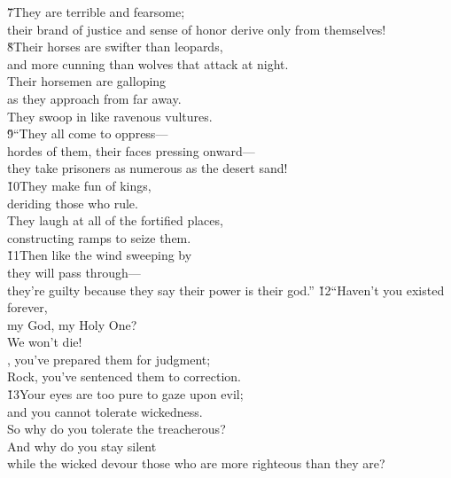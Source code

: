 \begin{poetry}
\poeml \v{7}They are terrible and fearsome; \\
\poemll    their brand of justice and sense of honor derive only from themselves! \\
\poeml \v{8}Their horses are swifter than leopards, \\
\poemll    and more cunning than wolves that attack at night. \\
\poeml Their horsemen are galloping \\
\poemll    as they approach from far away. \\
\poeml They swoop in like ravenous vultures. \\
\poeml \v{9}``They all come to oppress--- \\
\poemll    hordes of them, their faces pressing onward--- \\
\poeml they take prisoners as numerous as the desert sand! \\
\poeml \v{10}They make fun of kings, \\
\poemll    deriding those who rule. \\
\poeml They laugh at all of the fortified places, \\
\poemll    constructing ramps to seize them. \\
\poeml \v{11}Then like the wind sweeping by \\
\poemll    they will pass through--- \\
\poeml they're guilty because they say their power is their god.''
\poeml \v{12}``Haven't you existed forever, \\
\poemll    {} my God, my Holy One? \\
\poemlll       We won't die! \\
\poeml {}, you've prepared them for judgment; \\
\poemll    Rock, you've sentenced them to correction. \\
\poeml \v{13}Your eyes are too pure to gaze upon evil; \\
\poemll    and you cannot tolerate wickedness. \\
\poeml So why do you tolerate the treacherous? \\
\poemll    And why do you stay silent \\
\poemlll       while the wicked devour those who are more righteous than they are? \\

\end{poetry}
